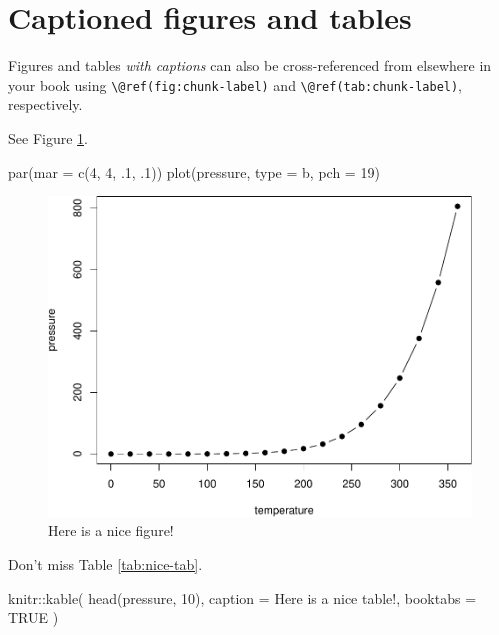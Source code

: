 \documentclass[
  12pt,
  twoside]{book}
\newenvironment{Shaded}{\begin{snugshade}}{\end{snugshade}}
\newcommand{\AttributeTok}[1]{\textcolor[rgb]{0.77,0.63,0.00}{#1}}
\newcommand{\ConstantTok}[1]{\textcolor[rgb]{0.00,0.00,0.00}{#1}}
\newcommand{\DecValTok}[1]{\textcolor[rgb]{0.00,0.00,0.81}{#1}}
\newcommand{\FunctionTok}[1]{\textcolor[rgb]{0.00,0.00,0.00}{#1}}
\newcommand{\NormalTok}[1]{#1}
\newcommand{\SpecialCharTok}[1]{\textcolor[rgb]{0.00,0.00,0.00}{#1}}
\newcommand{\StringTok}[1]{\textcolor[rgb]{0.31,0.60,0.02}{#1}}
\theoremstyle{definition}
\theoremstyle{definition}
\theoremstyle{definition}
\theoremstyle{definition}
\theoremstyle{remark}
\begin{document}
\hypertarget{captioned-figures-and-tables}{%
\section{Captioned figures and tables}\label{captioned-figures-and-tables}}

Figures and tables \emph{with captions} can also be cross-referenced from elsewhere in your book using \texttt{\textbackslash{}@ref(fig:chunk-label)} and \texttt{\textbackslash{}@ref(tab:chunk-label)}, respectively.

See Figure \ref{fig:nice-fig}.

\begin{Shaded}
\begin{Highlighting}[]
\FunctionTok{par}\NormalTok{(}\AttributeTok{mar =} \FunctionTok{c}\NormalTok{(}\DecValTok{4}\NormalTok{, }\DecValTok{4}\NormalTok{, .}\DecValTok{1}\NormalTok{, .}\DecValTok{1}\NormalTok{))}
\FunctionTok{plot}\NormalTok{(pressure, }\AttributeTok{type =} \StringTok{\textquotesingle{}b\textquotesingle{}}\NormalTok{, }\AttributeTok{pch =} \DecValTok{19}\NormalTok{)}
\end{Highlighting}
\end{Shaded}

\begin{figure}

{\centering \includegraphics[width=0.8\linewidth]{figuras/nice-fig-1} 

}

\caption{Here is a nice figure!}\label{fig:nice-fig}
\end{figure}

Don't miss Table \ref{tab:nice-tab}.

\begin{Shaded}
\begin{Highlighting}[]
\NormalTok{knitr}\SpecialCharTok{::}\FunctionTok{kable}\NormalTok{(}
  \FunctionTok{head}\NormalTok{(pressure, }\DecValTok{10}\NormalTok{), }\AttributeTok{caption =} \StringTok{\textquotesingle{}Here is a nice table!\textquotesingle{}}\NormalTok{,}
  \AttributeTok{booktabs =} \ConstantTok{TRUE}
\NormalTok{)}
\end{Highlighting}
\end{Shaded}
\end{document}
